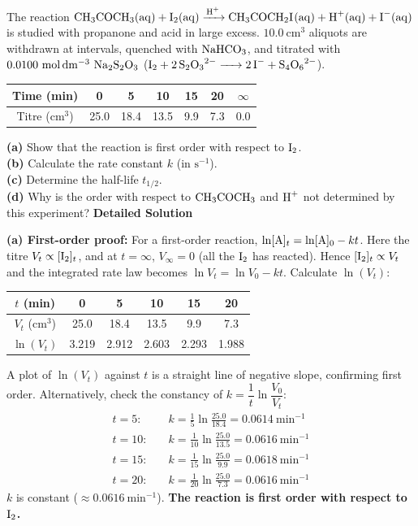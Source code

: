 \documentclass[11pt]{article}
\begin{document}
\begin{exoresolu}
The reaction $\ce{CH3COCH3(aq) + I2(aq) ->[H+] CH3COCH2I(aq) + H+(aq) + I-(aq)}$ is studied with propanone and acid in large excess. $10.0\ \mathrm{cm^3}$ aliquots are withdrawn at intervals, quenched with $\ce{NaHCO3}$, and titrated with $0.0100\ \mathrm{mol\,dm^{-3}}\ \ce{Na2S2O3}$ ($\ce{I2 + 2S2O3^2- -> 2I- + S4O6^2-}$).

\begin{center}
\begin{tabular}{|c|cccccc|}\hline
Time (min) & 0 & 5 & 10 & 15 & 20 & $\infty$ \\ \hline
Titre ($\mathrm{cm^3}$) & 25.0 & 18.4 & 13.5 & 9.9 & 7.3 & 0.0 \\ \hline
\end{tabular}
\end{center}

\textbf{(a)} Show that the reaction is first order with respect to $\ce{I2}$. \\
\textbf{(b)} Calculate the rate constant $k$ (in $\mathrm{s^{-1}}$). \\
\textbf{(c)} Determine the half-life $t_{1/2}$. \\
\textbf{(d)} Why is the order with respect to $\ce{CH3COCH3}$ and $\ce{H+}$ not determined by this experiment?
\tcblower
\textbf{Detailed Solution}

\textbf{(a) First-order proof:} For a first-order reaction, $\ln[\ce{A}]_t = \ln[\ce{A}]_0 - kt$.
Here the titre $V_t \propto [\ce{I2}]_t$, and at $t=\infty$, $V_\infty = 0$ (all the $\ce{I2}$ has reacted). Hence $[\ce{I2}]_t \propto V_t$ and the integrated rate law becomes $\ln V_t = \ln V_0 - kt$.
Calculate $\ln(V_t)$:

\begin{center}
\begin{tabular}{|c|ccccc|}\hline
$t$ (min) & 0 & 5 & 10 & 15 & 20 \\ \hline
$V_t$ ($\mathrm{cm^3}$) & 25.0 & 18.4 & 13.5 & 9.9 & 7.3 \\ \hline
$\ln(V_t)$ & 3.219 & 2.912 & 2.603 & 2.293 & 1.988 \\ \hline
\end{tabular}
\end{center}

A plot of $\ln(V_t)$ against $t$ is a straight line of negative slope, confirming first order. Alternatively, check the constancy of $k = \dfrac{1}{t}\ln\dfrac{V_0}{V_t}$:
\begin{align*}
t=5: &\quad k = \tfrac{1}{5}\ln\tfrac{25.0}{18.4} = 0.0614\ \mathrm{min^{-1}} \\
t=10: &\quad k = \tfrac{1}{10}\ln\tfrac{25.0}{13.5} = 0.0616\ \mathrm{min^{-1}} \\
t=15: &\quad k = \tfrac{1}{15}\ln\tfrac{25.0}{9.9} = 0.0618\ \mathrm{min^{-1}} \\
t=20: &\quad k = \tfrac{1}{20}\ln\tfrac{25.0}{7.3} = 0.0616\ \mathrm{min^{-1}}
\end{align*}
$k$ is constant ($\approx 0.0616\ \mathrm{min^{-1}}$). \textbf{The reaction is first order with respect to $\ce{I2}$.}


\end{exoresolu}
\end{document}
